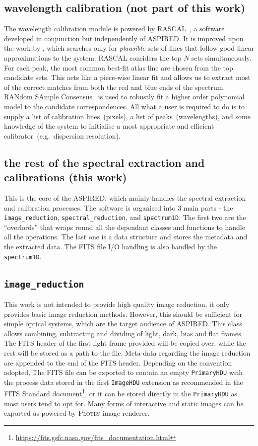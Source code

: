 \documentclass[fleqn,usenatbib]{mnras}
\begin{document}
\subsection*{wavelength calibration (not part of this work)}
The wavelength calibration module is powered by
\textsc{RASCAL}~\citep{2020zndo...4117517V, 2020ASPC..527..627V}, a software
developed in conjunction but independently of \textsc{ASPIRED}. It is improved
upon the work by \citet{2018ApOpt..57.6876S}, which searches only for
\textit{plausible} sets of lines that follow good linear approximations to the
system. \textsc{RASCAL} considers the top $N$ sets simultaneously. For each
peak, the most common best-fit atlas line are chosen from the top candidate
sets. This acts like a piece-wise linear fit and allows us to extract most of
the correct matches from both the red and blue ends of the spectrum. RANdom
SAmple Consensus~\citep[RANSAC][]{fischler_bolles_1981} is used to robustly
fit a higher order polynomial model to the candidate correspondences. All what
a user is required to do is to supply a list of calibration lines~(pixels), a
list of peaks~(wavelengths), and some knowledge of the system to initialise a
most appropriate and efficient calibrator~(e.g.\ dispersion resolution).

\subsection*{the rest of the spectral extraction and calibrations (this work)}
This is the core of the \textsc{ASPIRED}, which mainly handles the spectral
extraction and calibration processes. The software is organised into
3 main parts - the \texttt{image\_reduction}, \texttt{spectral\_reduction},
and \texttt{spectrum1D}. The first two are the ``overlords'' that wraps
round all the dependant classes and functions to handle all the operations.
The last one is a data structure and stores the metadata and the extracted
data. The FITS file I/O handling is also handled by the \texttt{spectrum1D}.

\subsection*{\texttt{image\_reduction}}
This work is not intended to provide high quality image reduction, it only
provides basic image reduction methods. However, this should be sufficient
for simple optical systems, which are the target audience of \textsc{ASPIRED}.
This class allows combining, subtracting and dividing of light, dark, bias
and flat frames. The FITS header of the first light frame provided will be
copied over, while the rest will be stored as a path to the file. Meta-data
regarding the image reduction are appended to the end of the FITS header.
Depending on the convention adopted, The FITS file can be exported to contain
an empty \texttt{PrimaryHDU} with the process data stored in the first
\texttt{ImageHDU} extension as recommended in the FITS Standard
document\footnote{\url{https://fits.gsfc.nasa.gov/fits_documentation.html}},
or it can be stored directly in the \texttt{PrimaryHDU} as most users tend
to opt for. Many forms of interactive and static images can be exported as
powered by \textsc{Plotly} image renderer.
\end{document}
